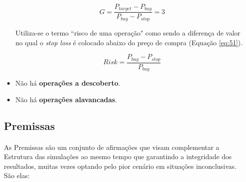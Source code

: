 \begin{itemize}
    \begin{equation} \label{eq:50}
        G = \dfrac{P_{target} - P_{buy}}{P_{buy} - P_{stop}} = 3
    \end{equation}

    Utiliza-se o termo ``risco de uma operação" como sendo a diferença de valor no qual o \textit{stop loss} é colocado abaixo do preço de compra (Equação \ref{eq:51}).

    \begin{equation} \label{eq:51}
        Risk = \dfrac{P_{buy} - P_{stop}}{P_{buy}}
    \end{equation}

    \item Não há \textbf{operações a descoberto}.
    \item Não há \textbf{operações alavancadas}.

\end{itemize}



\subsection{Premissas}

\paragraph{} As Premissas são um conjunto de afirmações que visam complementar a Estrutura das simulações ao mesmo tempo que garantindo a integridade dos resultados, muitas vezes optando pelo pior cenário em situações inconclusivas. São elas:

